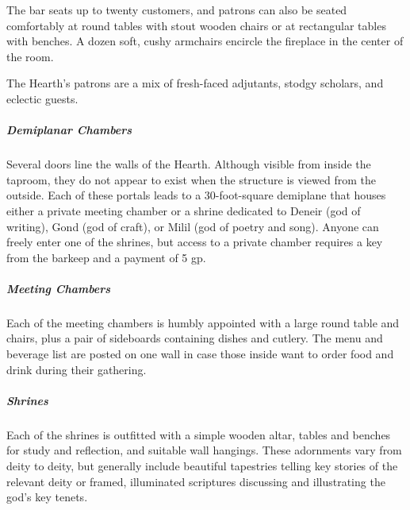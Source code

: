 \documentclass[10pt,a4paper,twoside,bg=print,twocolumn,openany,nodeprecatedcode]{dndbook}
\begin{document}
The bar seats up to twenty customers, and patrons can also be seated comfortably at round tables with stout wooden chairs or at rectangular tables with benches. A dozen soft, cushy armchairs encircle the fireplace in the center of the room.

The Hearth's patrons are a mix of fresh-faced adjutants, stodgy scholars, and eclectic guests.

\subparagraph{Demiplanar Chambers}
Several doors line the walls of the Hearth. Although visible from inside the taproom, they do not appear to exist when the structure is viewed from the outside. Each of these portals leads to a 30-foot-square demiplane that houses either a private meeting chamber or a shrine dedicated to Deneir (god of writing), Gond (god of craft), or Milil (god of poetry and song). Anyone can freely enter one of the shrines, but access to a private chamber requires a key from the barkeep and a payment of 5 gp.

\subparagraph{Meeting Chambers}
Each of the meeting chambers is humbly appointed with a large round table and chairs, plus a pair of sideboards containing dishes and cutlery. The menu and beverage list are posted on one wall in case those inside want to order food and drink during their gathering.

\subparagraph{Shrines}
Each of the shrines is outfitted with a simple wooden altar, tables and benches for study and reflection, and suitable wall hangings. These adornments vary from deity to deity, but generally include beautiful tapestries telling key stories of the relevant deity or framed, illuminated scriptures discussing and illustrating the god's key tenets.
\end{document}
